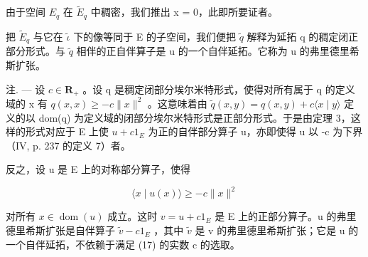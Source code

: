 由于空间 \(E_{q}\) 在 \(\widetilde{E}_{q}\) 中稠密，我们推出 x = 0，此即所要证者。

把 \(\widetilde{E}_{q}\) 与它在 \(\widetilde{\iota}\) 下的像等同于 E 的子空间，我们便把 \(\widetilde{q}\) 解释为延拓 q 的稠定闭正部分形式。与 \(\widetilde{q}\) 相伴的正自伴算子是 u 的一个自伴延拓。它称为 u 的弗里德里希斯扩张。

注. --- 设 \(c \in \mathbf R_{+}\) 。设 q 是稠定闭部分埃尔米特形式，使得对所有属于 q 的定义域的 x 有 \(q(x, x) \geqslant -c \|x\|^2\) 。这意味着由 \(\widetilde{q}(x, y) = q(x, y) + c \langle x \mid y \rangle\) 定义的以 dom(q) 为定义域的闭部分埃尔米特形式是正部分形式。于是由定理 3，这样的形式对应于 E 上使 \(u + c1_{E}\) 为正的自伴部分算子 u，亦即使得 u 以 -c 为下界（IV, p. 237 的定义 7）者。

反之，设 u 是 E 上的对称部分算子，使得

\[
\langle x \mid u (x) \rangle \geqslant - c \| x \| ^ {2}\tag{17}
\]

对所有 \(x \in \operatorname{dom}(u)\) 成立。这时 \(v = u + c1_{E}\) 是 E 上的正部分算子。u 的弗里德里希斯扩张是自伴算子 \(\widetilde{v} - c1_{E}\) ，其中 \(\widetilde{v}\) 是 v 的弗里德里希斯扩张；它是 u 的一个自伴延拓，不依赖于满足 (17) 的实数 c 的选取。